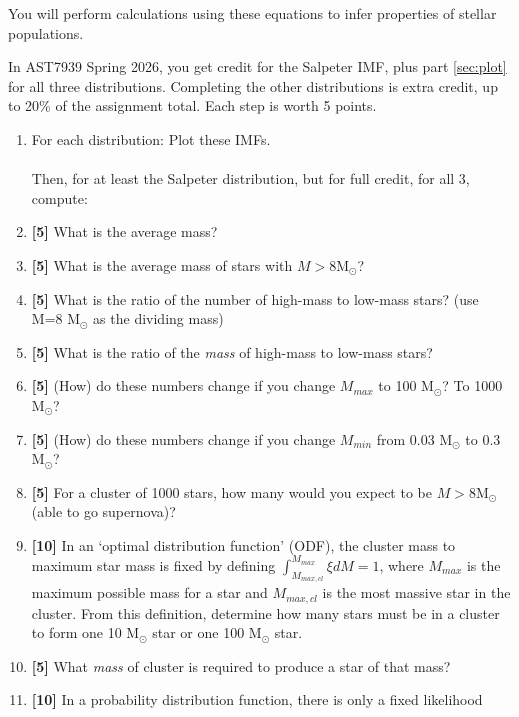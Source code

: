 \documentclass{article}
\newcommand{\msun}{\ensuremath{\mathrm{M}_\odot}\xspace}
\begin{document}
\begin{enumerate}
    You will perform calculations using these equations to infer properties of stellar
    populations.

    In AST7939 Spring 2026,  you get credit for the Salpeter IMF, plus part \ref{sec:plot} for all three distributions.
    Completing the other distributions is extra credit, up to 20\% of the assignment total.
    Each step is worth 5 points.

    \begin{enumerate}

        \item For each distribution: Plot these IMFs.
            \label{sec:plot}
            \\
            \\

            Then, for at least the Salpeter distribution, but for full credit, for all 3, compute:
        \item \textbf{[5]} What is the average mass?
        \item \textbf{[5]} What is the average mass of stars with $M>8\msun$?
        \item \textbf{[5]} What is the ratio of the number of high-mass to low-mass stars?
            (use M=8 \msun as the dividing mass)
        \item \textbf{[5]} What is the ratio of the \emph{mass} of high-mass to low-mass stars?
        \item \textbf{[5]} (How) do these numbers change if you change $M_{max}$ to 100 \msun?  To 1000 \msun?
        \item \textbf{[5]} (How) do these numbers change if you change $M_{min}$ from 0.03 \msun to 0.3 \msun?
        \item \textbf{[5]} For a cluster of 1000 stars, how many would you expect to be
            $M>8\msun$ (able to go supernova)?
        \item \textbf{[10]} In an `optimal distribution function' (ODF), the cluster mass to maximum star mass
            is fixed by defining $\int_{M_{max,cl}}^{M_{max}} \xi dM = 1$,
            where $M_{max}$ is the maximum possible mass for a star and $M_{max,cl}$ is
            the most massive star in the cluster.
            From this definition, determine how many stars must be in a cluster
            to form one 10 \msun star or one 100 \msun star.
        \item \textbf{[5]} What \emph{mass} of cluster is required to produce a star of that mass?
        \item \textbf{[10]} In a probability distribution function, there is only a fixed likelihood

\end{enumerate}
\end{enumerate}
\end{document}
